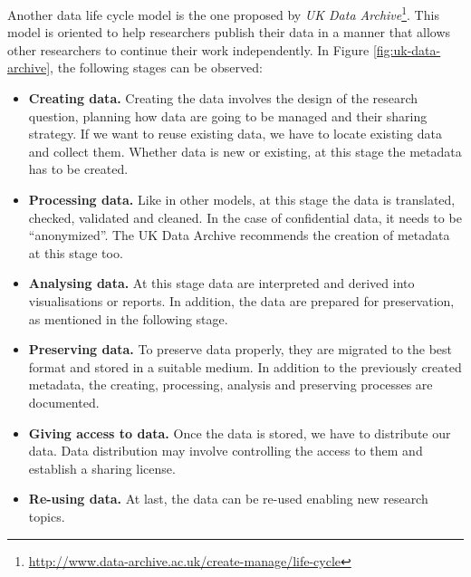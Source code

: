 Another data life cycle model  is the one proposed by \textit{UK Data Archive}\footnote{\url{http://www.data-archive.ac.uk/create-manage/life-cycle}}. This model is oriented to help researchers publish their data in a manner that allows other researchers to continue their work independently. In Figure \ref{fig:uk-data-archive}, the following stages can be observed:
\begin{itemize}
    \item \textbf{Creating data.} Creating the data involves the design of the research question, planning how data are going to be managed and their sharing strategy. If we want to reuse existing data, we have to locate existing data and collect them. Whether data is new or existing, at this stage the metadata has to be created.
    \item \textbf{Processing data.} Like in other models, at this stage the data is translated, checked, validated and cleaned. In the case of confidential data, it needs to be ``anonymized''. The UK Data Archive recommends the creation of metadata at this stage too.
    \item \textbf{Analysing data.} At this stage data are interpreted and derived into visualisations or reports. In addition, the data are prepared for preservation, as mentioned in the following stage. 
    \item \textbf{Preserving data.} To preserve data properly, they are migrated to the best format and stored in a suitable medium. In addition to the previously created metadata, the creating, processing, analysis and preserving processes are documented.
    \item \textbf{Giving access to data.} Once the data is stored, we have to distribute our data. Data distribution may involve controlling the access to them and establish a sharing license.
    \item \textbf{Re-using data.} At last, the data can be re-used enabling new research topics.
\end{itemize}

